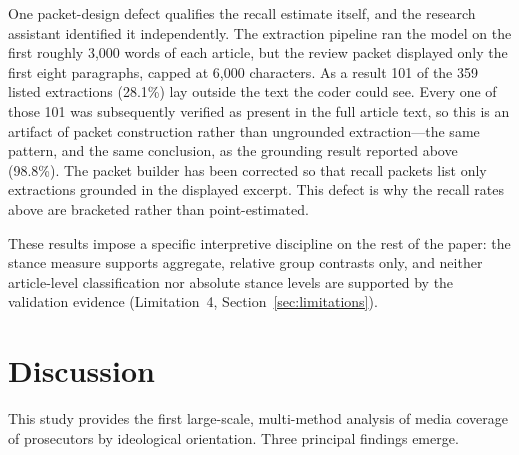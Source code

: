 \documentclass[12pt, letterpaper]{article}
\begin{document}
One packet-design defect qualifies the recall estimate itself, and the research assistant identified it independently. The extraction pipeline ran the model on the first roughly 3,000 words of each article, but the review packet displayed only the first eight paragraphs, capped at 6,000 characters. As a result 101 of the 359 listed extractions (28.1\%) lay outside the text the coder could see. Every one of those 101 was subsequently verified as present in the full article text, so this is an artifact of packet construction rather than ungrounded extraction---the same pattern, and the same conclusion, as the grounding result reported above (98.8\%). The packet builder has been corrected so that recall packets list only extractions grounded in the displayed excerpt. This defect is why the recall rates above are bracketed rather than point-estimated.

These results impose a specific interpretive discipline on the rest of the paper: the stance measure supports aggregate, relative group contrasts only, and neither article-level classification nor absolute stance levels are supported by the validation evidence (Limitation~4, Section~\ref{sec:limitations}).

\section{Discussion}

This study provides the first large-scale, multi-method analysis of media coverage of prosecutors by ideological orientation. Three principal findings emerge.
\end{document}

